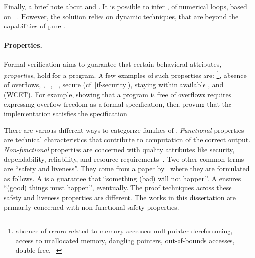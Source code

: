 Finally, a brief note about  and . It is
possible to infer , of numerical loops, based on ~\cite{nguyen2017}. However, the solution relies on dynamic
techniques, that are beyond the capabilities of pure .

\paragraph*{Properties.}
Formal verification aims to guarantee that certain
behavioral attributes, \ie \emph{properties}, hold for a program. A few examples
of such properties are: \footnote{\Ie absence of errors
related to memory accesses: null-pointer dereferencing, access to unallocated
memory, dangling pointers, out-of-bounds accesses, double-free,
\etc~\cite{muller2024}}, absence of overflows, , ~\cite{georges2025}, ~\cite{roscoe1987}, secure
 (cf~\autoref{if-security}), staying within available
, and  (WCET). For example,
showing that a program is free of overflows requires expressing overflow-freedom
as a formal specification, then proving that the implementation satisfies the
specification.

There are various different ways to categorize families of .
\emph{Functional} properties are technical
characteristics that contribute to computation of the correct output.
\emph{Non-functional} properties are concerned
with quality attributes like security, dependability, reliability, and resource
requirements~\cite{terbeek2018}. Two other common terms are \enquote{safety
and liveness}. They come from a paper by~\textcite{lamport1977} where they are
formulated as follows. A \emph{} is a guarantee that
\enquote{something (bad) will not happen}. A \emph{}
ensures \enquote{(good) things must happen}, eventually. The proof techniques
across these safety and liveness properties are different. The works in this
dissertation are primarily concerned with non-functional safety properties.

